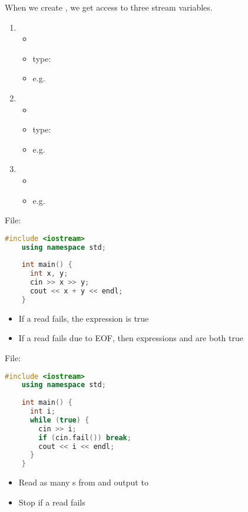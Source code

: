 When we create , we get access to three stream variables.
\begin{enumerate}
    \item {}
          \begin{itemize}
              \item {}
              \item type: 
              \item e.g. 
          \end{itemize}
    \item {}
          \begin{itemize}
              \item {}
              \item type: 
              \item e.g. 
          \end{itemize}
    \item {}
          \begin{itemize}
              \item {}
              \item e.g. 
          \end{itemize}
\end{enumerate}

File: 
\begin{lstlisting}[language = C++]
    #include <iostream>
    using namespace std;
    
    int main() {
      int x, y;
      cin >> x >> y;
      cout << x + y << endl;
    }
\end{lstlisting}
\begin{itemize}
    \item If a read fails, the expression  is true
    \item If a read fails due to EOF, then expressions 
          and  are both true
\end{itemize}

File: 
\begin{lstlisting}[language = C++]
    #include <iostream>
    using namespace std;
    
    int main() {
      int i;
      while (true) {
        cin >> i;
        if (cin.fail()) break;
        cout << i << endl;
      }
    }
\end{lstlisting}
\begin{itemize}
    \item Read as many s from  and output to 
    \item Stop if a read fails
\end{itemize}


